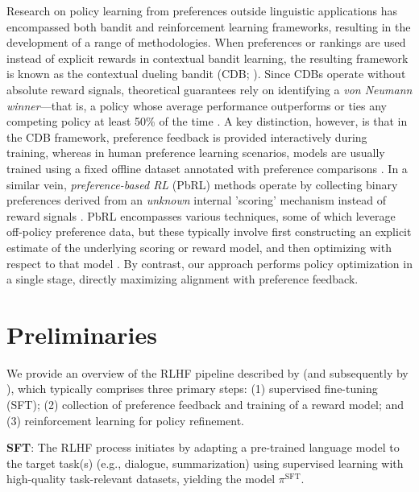 Research on policy learning from preferences outside linguistic applications has encompassed both bandit and reinforcement learning frameworks, resulting in the development of a range of methodologies. When preferences or rankings are used instead of explicit rewards in contextual bandit learning, the resulting framework is known as the contextual dueling bandit (CDB; \cite{yue2012karmed,dudik2015contextual}). Since CDBs operate without absolute reward signals, theoretical guarantees rely on identifying a \textit{von Neumann winner}—that is, a policy whose average performance outperforms or ties any competing policy at least 50\% of the time \citep{dudik2015contextual}. A key distinction, however, is that in the CDB framework, preference feedback is provided interactively during training, whereas in human preference learning scenarios, models are usually trained using a fixed offline dataset annotated with preference comparisons \citep{yan2022human}. In a similar vein, \textit{preference-based RL} (PbRL) methods operate by collecting binary preferences derived from an \textit{unknown} internal 'scoring' mechanism instead of reward signals \citep{BusaFekete2014,ruiz2023dueling}. PbRL encompasses various techniques, some of which leverage off-policy preference data, but these typically involve first constructing an explicit estimate of the underlying scoring or reward model, and then optimizing with respect to that model \citep{jain2013learning,BusaFekete2014,christiano2017deep,sadigh2017active,kupcsik2018learning}. By contrast, our approach performs policy optimization in a single stage, directly maximizing alignment with preference feedback.

\section{Preliminaries}\label{section:prelims}

We provide an overview of the RLHF pipeline described by \citeauthor{ziegler2020finetuning} (and subsequently by \citep{stiennon2022learning, bai2022training, ouyang2022training}), which typically comprises three primary steps: (1) supervised fine-tuning (SFT); (2) collection of preference feedback and training of a reward model; and (3) reinforcement learning for policy refinement.

\textbf{SFT}: The RLHF process initiates by adapting a pre-trained language model to the target task(s) (e.g., dialogue, summarization) using supervised learning with high-quality task-relevant datasets, yielding the model $\pi^\text{SFT}$. 

